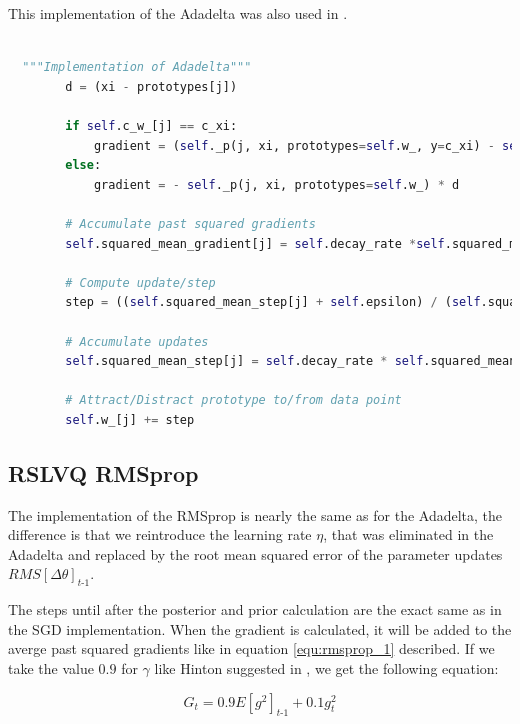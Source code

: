 \documentclass[12pt,oneside,a4paper,parskip]{scrbook}
\begin{document}
This implementation of the Adadelta was also used in \cite{PassiveDriftonRSLVQ}.

\begin{lstlisting}[label=lst:adadelta,
  language=python,
  firstnumber=1,
  caption= Adadelta implementation from \cite{PassiveDriftonRSLVQ}.]			   

  """Implementation of Adadelta"""
        d = (xi - prototypes[j])

        if self.c_w_[j] == c_xi:
            gradient = (self._p(j, xi, prototypes=self.w_, y=c_xi) - self._p(j, xi, prototypes=self.w_)) * d
        else:
            gradient = - self._p(j, xi, prototypes=self.w_) * d

        # Accumulate past squared gradients
        self.squared_mean_gradient[j] = self.decay_rate *self.squared_mean_gradient[j] + (1 - self.decay_rate) * gradient ** 2

        # Compute update/step
        step = ((self.squared_mean_step[j] + self.epsilon) / (self.squared_mean_gradient[j] + self.epsilon)) **0.5 * gradient

        # Accumulate updates
        self.squared_mean_step[j] = self.decay_rate * self.squared_mean_step[j] + (1 - self.decay_rate) * step ** 2

        # Attract/Distract prototype to/from data point
        self.w_[j] += step
\end{lstlisting}

\subsection{RSLVQ RMSprop}

The implementation of the RMSprop is nearly the same as for the Adadelta, the difference is that we reintroduce the learning
rate $\eta$, that was eliminated in the Adadelta and replaced by the root mean squared error of the parameter updates $\textit{RMS}[\Delta\theta]_\textit{t-1}$.

The steps until after the posterior and prior calculation are the exact same as in the SGD implementation.
When the gradient is calculated, it will be added to the averge past squared gradients like in equation \ref{equ:rmsprop_1} described.
If we take the value $0.9$ for $\gamma$ like Hinton suggested in \cite{RMSprop_Hinton}, we get the following equation:

\begin{equation}
  G_t = 0.9\textit{E}[\textit{g}^2]_\textit{t-1} + 0.1\textit{g}^2_t 
\end{equation}
\end{document}
